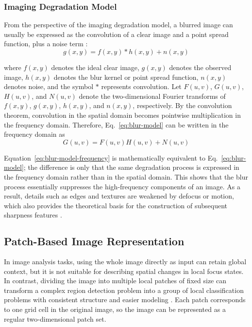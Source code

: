 \subsubsection{Imaging Degradation Model}
\par From the perspective of the imaging degradation model, a blurred image can
usually be expressed as the convolution of a clear image and a point spread
function, plus a noise term \cite{lam2000iterative}:
\begin{equation}
    g(x,y)=f(x,y)*h(x,y)+n(x,y)
    \label{eq:blur-model}
\end{equation}
\par where $f(x,y)$ denotes the ideal clear image, $g(x,y)$ denotes the observed
image, $h(x,y)$ denotes the blur kernel or point spread function, $n(x,y)$
denotes noise, and the symbol $*$ represents convolution. Let $F(u,v)$,
$G(u,v)$, $H(u,v)$, and $N(u,v)$ denote the two-dimensional Fourier transforms
of $f(x,y)$, $g(x,y)$, $h(x,y)$, and $n(x,y)$, respectively. By the convolution
theorem, convolution in the spatial domain becomes pointwise multiplication in
the frequency domain. Therefore, Eq.~\eqref{eq:blur-model} can be written in the
frequency domain as
\begin{equation}
    G(u,v)=F(u,v)H(u,v)+N(u,v)
    \label{eq:blur-model-frequency}
\end{equation}
\par Equation~\eqref{eq:blur-model-frequency} is mathematically equivalent to
Eq.~\eqref{eq:blur-model}; the difference is only that the same degradation
process is expressed in the frequency domain rather than in the spatial domain.
This shows that the blur process essentially suppresses the high-frequency
components of an image. As a result, details such as edges and textures are
weakened by defocus or motion, which also provides the theoretical basis for the
construction of subsequent sharpness features \cite{lam2000iterative}.

\subsection{Patch-Based Image Representation}
\par In image analysis tasks, using the whole image directly as input can retain
global context, but it is not suitable for describing spatial changes in local
focus states. In contrast, dividing the image into multiple local patches of
fixed size can transform a complex region detection problem into a group of
local classification problems with consistent structure and easier modeling
\cite{Hou_2016_CVPR}. Each patch corresponds to one grid cell in the original
image, so the image can be represented as a regular two-dimensional patch set.

